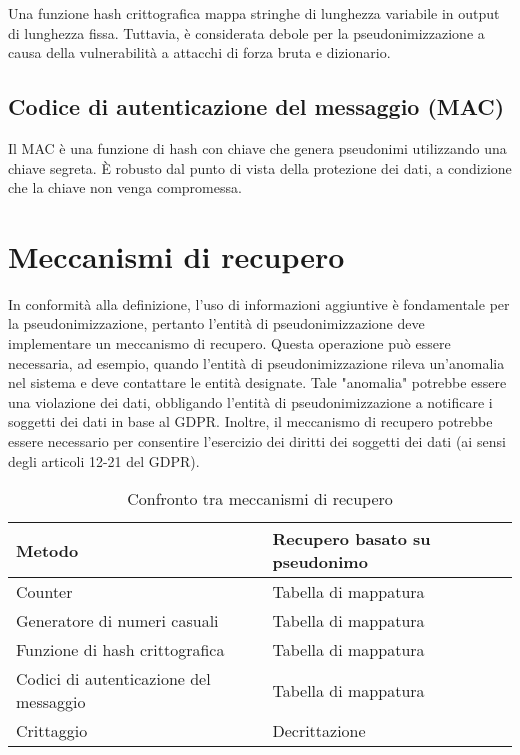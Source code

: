 Una funzione hash crittografica mappa stringhe di lunghezza variabile in output di lunghezza fissa. Tuttavia, è considerata debole per la pseudonimizzazione a causa della vulnerabilità a attacchi di forza bruta e dizionario.

\subsection{Codice di autenticazione del messaggio (MAC)}

Il MAC è una funzione di hash con chiave che genera pseudonimi utilizzando una chiave segreta. È robusto dal punto di vista della protezione dei dati, a condizione che la chiave non venga compromessa.

\section{Meccanismi di recupero}

In conformità alla definizione, l'uso di informazioni aggiuntive è fondamentale per la pseudonimizzazione, pertanto l'entità di pseudonimizzazione deve implementare un meccanismo di recupero.
Questa operazione può essere necessaria, ad esempio, quando l'entità di pseudonimizzazione rileva un'anomalia nel sistema e deve contattare le entità designate. Tale "anomalia" potrebbe essere una violazione dei dati, obbligando l'entità di pseudonimizzazione a notificare i soggetti dei dati in base al GDPR. Inoltre, il meccanismo di recupero potrebbe essere necessario per consentire l'esercizio dei diritti dei soggetti dei dati (ai sensi degli articoli 12-21 del GDPR).

\begin{table}[ht]
\centering
\begin{tabular}{|l|l|}
\hline
\textbf{Metodo}              & \textbf{Recupero basato su pseudonimo} \\ \hline
Counter                      & Tabella di mappatura                  \\ \hline
Generatore di numeri casuali & Tabella di mappatura                  \\ \hline
Funzione di hash crittografica  & Tabella di mappatura                  \\ \hline
Codici di autenticazione del messaggio & Tabella di mappatura                  \\ \hline
Crittaggio                   & Decrittazione                         \\ \hline
\end{tabular}
\caption{Confronto tra meccanismi di recupero}
\end{table}


